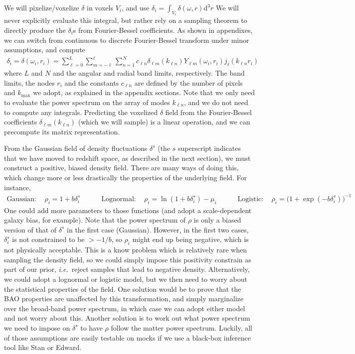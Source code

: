 \documentclass{aastex6}
\newcommand{\ie}{{\textit{i.e.}~}}
\renewcommand{\d}{{\mathrm{d}}}
\newcommand{\eqn}[1]{\begin{eqnarray}#1\end{eqnarray}}
\begin{document}
We will pixelize/voxelize $\delta$ in voxels $V_i$, and use $\delta_i=\int_{V_i} \delta(\omega, r) \d^3r$
We will never explicitly evaluate this integral, but rather rely on a sampling theorem to directly produce the $\delta_i$s from Fourier-Bessel coefficients.
As shown in appendixes, we can switch from continuous to discrete Fourier-Bessel transform under minor assumptions, and compute 
\eqn{
	\delta_i = \delta(\omega_i, r_i) = \sum_{\ell = 0}^L \sum_{m = -\ell}^\ell \sum_{n = 1}^N c_{\ell n} \delta_{\ell m}(k_{\ell n}) Y_{\ell m}(\omega_i, r_i) j_\ell(k_{\ell n} r_i)
}
where $L$ and $N$ and the angular and radial band limits, respectively.
The band limits, the nodes $r_i$ and the constants $c_{\ell n}$ are defined by the number of pixels and $k_\mathrm{max}$ we adopt, as explained in the appendix sections.
Note that we only need to evaluate the power spectrum on the array of modes $k_{\ell n}$, and we do not need to compute any integrals.
Predicting the voxelized $\delta$ field from the Fourier-Bessel coefficients $ \delta_{\ell m}(k_{\ell n}) $ (which we will sample) is a linear operation, and we can precompute its matrix representation.

From the Gaussian field of density fluctuations $\delta^s$ (the $s$ superscript indicates that we have moved to redshift space, as described in the next section), we must construct a positive, biased density field. There are many ways of doing this, which change more or less drastically the properties of the underlying field. For instance,
\eqn{
	\mathrm{Gaussian:}\quad 	\rho_i = 1 + b \delta^s_i \quad\quad\quad
	\mathrm{Lognormal:}\quad	\rho_i = \ln(1 + b \delta^s_i) - \mu_i\quad\quad\quad
	\mathrm{Logistic:}\quad	\rho_i = \bigl(1 + \exp(-b \delta^s_i)\bigr)^{-1}
}
One could add more parameters to those functions (and adopt a scale-dependent galaxy bias, for example). 
Note that the power spectrum of $\rho$ is only a biased version of that of $\delta^s$ in the first case (Gaussian). 
However, in the first two cases, $\delta^s_i$ is not constrained to be $>-1/b$, so $\rho_i$ might end up being negative, which is not physically acceptable. 
This is a know problem which is relatively rare when sampling the density field, so we could simply impose this positivity constrain as part of our prior, \ie reject samples that lead to negative density.
Alternatively, we could adopt a lognormal or logistic model, but we then need to worry about the statistical properties of the field.
One solution would be to prove that the BAO properties are unaffected by this transformation, and simply marginalize over the broad-band power spectrum, in which case we can adopt either model and not worry about this.
Another solution is to work out what power spectrum we need to impose on $\delta^s$ to have $\rho$ follow the matter power spectrum.
Luckily, all of those assumptions are easily testable on mocks if we use a black-box inference tool like Stan or Edward.
\end{document}
